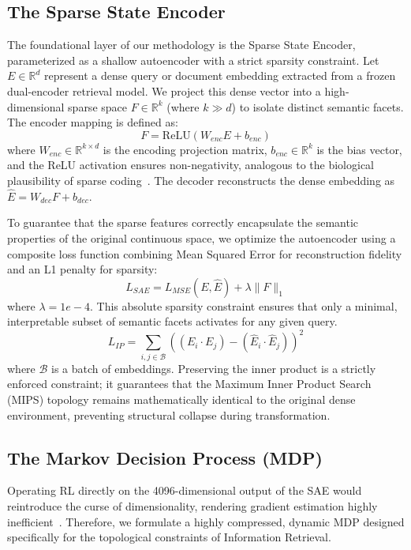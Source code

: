 \subsection{The Sparse State Encoder}
The foundational layer of our methodology is the Sparse State Encoder, parameterized as a shallow autoencoder with a strict sparsity constraint. Let $E \in \mathbb{R}^d$ represent a dense query or document embedding extracted from a frozen dual-encoder retrieval model. We project this dense vector into a high-dimensional sparse space $F \in \mathbb{R}^k$ (where $k \gg d$) to isolate distinct semantic facets. The encoder mapping is defined as:
\begin{equation}
F = \text{ReLU}(W_{enc}E + b_{enc})
\end{equation}
where $W_{enc} \in \mathbb{R}^{k \times d}$ is the encoding projection matrix, $b_{enc} \in \mathbb{R}^k$ is the bias vector, and the ReLU activation ensures non-negativity, analogous to the biological plausibility of sparse coding~\citep{olshausen1996, glorot2011}. The decoder reconstructs the dense embedding as $\hat{E} = W_{dec}F + b_{dec}$.

To guarantee that the sparse features correctly encapsulate the semantic properties of the original continuous space, we optimize the autoencoder using a composite loss function combining Mean Squared Error for reconstruction fidelity and an L1 penalty for sparsity:
\begin{equation}
L_{SAE} = L_{MSE}(E, \hat{E}) + \lambda \|F\|_1
\end{equation}
where $\lambda = 1e-4$. This absolute sparsity constraint ensures that only a minimal, interpretable subset of semantic facets activates for any given query.
\begin{equation}
L_{IP} = \sum_{i, j \in \mathcal{B}} ((E_i \cdot E_j) - (\hat{E}_i \cdot \hat{E}_j))^2
\end{equation}
where $\mathcal{B}$ is a batch of embeddings. Preserving the inner product is a strictly enforced constraint; it guarantees that the Maximum Inner Product Search (MIPS) topology remains mathematically identical to the original dense environment, preventing structural collapse during transformation.

\subsection{The Markov Decision Process (MDP)}
Operating RL directly on the 4096-dimensional output of the SAE would reintroduce the curse of dimensionality, rendering gradient estimation highly inefficient~\citep{lillicrap2016}. Therefore, we formulate a highly compressed, dynamic MDP designed specifically for the topological constraints of Information Retrieval.

